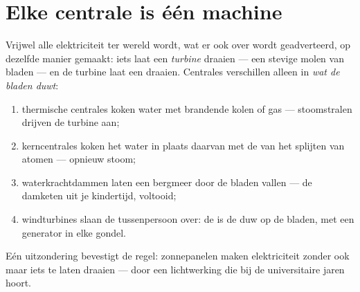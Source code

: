 \section{Elke centrale is één machine}

\begin{proposition}\label{prop:g9:alternator:core}
Vrijwel alle elektriciteit ter wereld wordt, wat er ook over wordt
geadverteerd, op dezelfde manier gemaakt: iets laat een \emph{turbine}
draaien --- een stevige molen van bladen --- en de turbine laat een
 draaien. Centrales verschillen alleen in
\emph{wat de bladen duwt}:
\begin{enumerate}
  \item thermische centrales koken water met brandende kolen of gas
        --- stoomstralen drijven de turbine aan;
  \item kerncentrales koken het water in plaats daarvan met de
         van het splijten van atomen --- opnieuw stoom;
  \item waterkrachtdammen laten een bergmeer door de bladen vallen ---
        de damketen uit je kindertijd, voltooid;
  \item windturbines slaan de tussenpersoon over: de
         is de duw op de bladen, met een
        generator in elke gondel.
\end{enumerate}
Eén uitzondering bevestigt de regel: zonnepanelen maken elektriciteit
zonder ook maar iets te laten draaien --- door een
lichtwerking die bij de universitaire jaren hoort.
\end{proposition}

